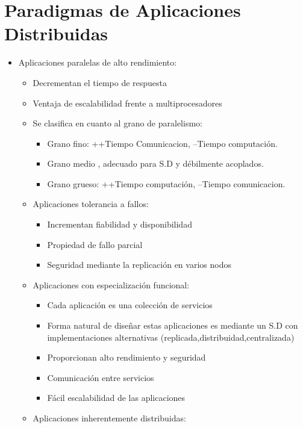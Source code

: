 \section{Paradigmas de Aplicaciones Distribuidas}
\begin{itemize}


\item Aplicaciones paralelas de alto rendimiento:
    \begin{itemize}
        \item Decrementan el tiempo de respuesta
        \item Ventaja de escalabilidad frente a multiprocesadores
        \item Se clasifica en cuanto al grano de paralelismo:
        \begin{itemize}
            \item Grano fino: ++Tiempo Comunicacion, --Tiempo computación.
            \item Grano medio , adecuado para S.D y débilmente acoplados.
            \item Grano grueso: ++Tiempo computación, --Tiempo comunicacion.
    \end{itemize}
\item Aplicaciones tolerancia a fallos:
    \begin{itemize}
        \item Incrementan fiabilidad y disponibilidad
        \item Propiedad de fallo parcial
        \item Seguridad mediante la replicación en varios nodos
    \end{itemize}
\item Aplicaciones con especialización funcional:
    \begin{itemize}
        \item Cada aplicación es una colección de servicios
        \item Forma natural de diseñar estas aplicaciones es mediante un S.D con implementaciones alternativas (replicada,distribuidad,centralizada)
        \item Proporcionan alto rendimiento y seguridad
        \item Comunicación entre servicios
        \item Fácil escalabilidad de las aplicaciones
    \end{itemize}
\item Aplicaciones inherentemente distribuidas:
    \begin{itemize}

\end{itemize}
\end{itemize}
\end{itemize}
